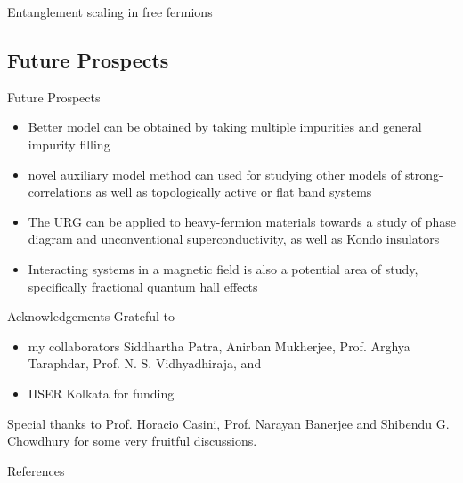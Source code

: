 \documentclass[11pt,aspectratio=169]{beamer}
\begin{document}
\begin{frame}{Entanglement scaling in free fermions}
\begin{minipage}{0.41\textwidth}
\end{minipage}
\hspace*{-40pt}
\end{frame}

\begin{frame}{}
\section{Future Prospects}
\end{frame}

\begin{frame}{Future Prospects}
\begin{itemize}
	\item Better model can be obtained by taking multiple impurities and general impurity filling\\[20pt]
\item novel auxiliary model method can used for studying other models of strong-correlations as well as topologically active or flat band systems\\[20pt]
\item The URG can be applied to heavy-fermion materials towards a study of phase diagram and unconventional superconductivity, as well as Kondo insulators\\[20pt]
\item Interacting systems in a magnetic field is also a potential area of study, specifically fractional quantum hall effects
\end{itemize}
\end{frame}

\begin{frame}{Acknowledgements}
\flushleft
Grateful to\\[10pt]
\begin{itemize}
	\item my collaborators Siddhartha Patra, Anirban Mukherjee, Prof. Arghya Taraphdar, Prof. N. S. Vidhyadhiraja, and \\[10pt]
	\item IISER Kolkata for funding \\[10pt]
\end{itemize}

Special thanks to Prof. Horacio Casini, Prof. Narayan Banerjee and Shibendu G. Chowdhury for some very fruitful discussions.
	
\end{frame}

\begin{frame}[allowframebreaks]{References}
\printbibliography
\end{frame}
\end{document}
